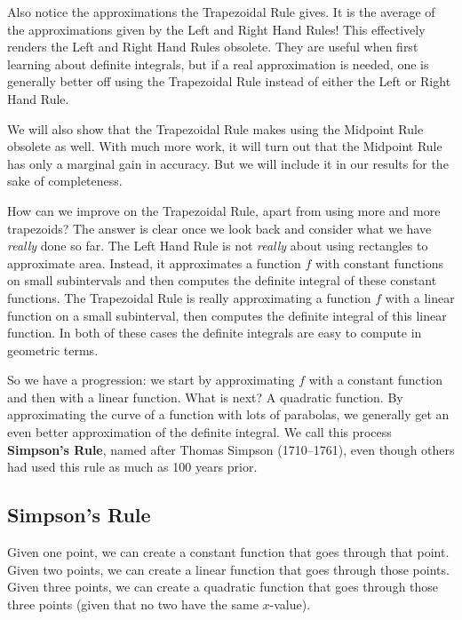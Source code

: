 Also notice the  approximations the Trapezoidal Rule gives. It is  the average of the approximations given by the Left and Right Hand Rules! This effectively renders the Left and Right Hand Rules obsolete. They are useful when first learning about definite integrals, but if a real approximation is needed, one is generally better off using the Trapezoidal Rule instead of either the Left or Right Hand Rule.

We will also show that the Trapezoidal Rule makes using the Midpoint Rule obsolete as well.  With much more work, it will turn out that the Midpoint Rule has only a marginal gain in accuracy.  But we will include it in our results for the sake of completeness.\bigskip

How can we improve on the Trapezoidal Rule, apart from using more and more trapezoids? The answer is clear once we look back and consider what we have \emph{really} done so far. The Left Hand Rule is not \emph{really} about using rectangles to approximate area. Instead, it approximates a function $f$ with constant functions on small subintervals and then computes the definite integral of these constant functions. The Trapezoidal Rule is really approximating a function $f$ with a linear function on a small subinterval, then computes the definite integral of this linear function. In both of these cases the definite integrals are easy to compute in geometric terms.

So we have a progression: we start by approximating $f$ with a constant function and then with a linear function. What is next? A quadratic function. By approximating the curve of a function with lots of parabolas, we generally get an even better approximation of the definite integral. We call this process \textbf{Simpson's Rule}, named after Thomas Simpson (1710--1761), even though others had used this rule as much as 100 years prior.

\subsection{Simpson's Rule}

Given one point, we can create a constant function that goes through that point. Given two points, we can create a linear function that goes through those points. Given three points, we can create a quadratic function that goes through those three points (given that no two have the same $x$-value).

